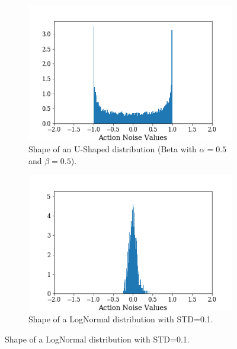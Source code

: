 \begin{figure}
\begin{subfigure}[b]{0.45\textwidth}
                    \label{fig:noises_quad_dist}
                \end{subfigure}
                \hfill
                \begin{subfigure}[b]{0.45\textwidth}
                    \centering
                    \includegraphics[width=\textwidth]{images/results/noises_ush_dist.png}
                    \caption{Shape of an U-Shaped distribution (Beta with $\alpha=0.5$ and $\beta=0.5$).}
                    \label{fig:noises_ush_dist}
                \end{subfigure}
                \hfill
                \begin{subfigure}[b]{0.45\textwidth}
                    \centering
                    \includegraphics[width=\textwidth]{images/results/noises_logns_dist.png}
                    \caption{Shape of a LogNormal distribution with STD=0.1.}
                    \label{fig:noises_logns_dist}

\end{subfigure}
\end{figure}
